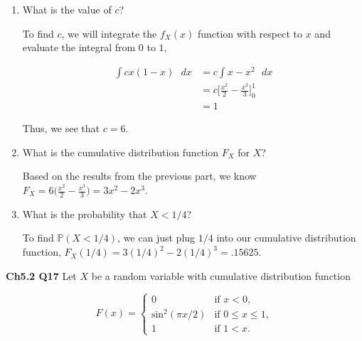 \documentclass[12pt]{article}
\begin{document}
\begin{enumerate}[label=(\alph*)]
\item What is the value of $c$?

\noindent
To find $c$, we will integrate the $f_X(x) $ function with respect to $x$ and evaluate the integral from $0$ to $1$,

\begin{align*}
\int c x(1-x) \text{ } dx &= c \int  x-x^2 \text{ } dx \\
&= c \Bigg [ \frac{x^2}{2}-\frac{x^3}{3} \Bigg ]_{0}^{1} \\
&=1
\end{align*} 

\noindent
Thus, we see that $c = 6$.

\item What is the cumulative distribution function $F_X$ for $X$?

\noindent
Based on the results from the previous part, we know $F_X = 6 \big ( \frac{x^2}{2}-\frac{x^3}{3} \big ) = 3x^2-2x^3$.

\item What is the probability that $X < 1/4$?

\noindent
To find $\mathbb{P}(X < 1/4)$, we can just plug $1/4$ into our cumulative distribution function, $F_X(1/4) = 3(1/4)^2-2(1/4)^3 = .15625$.

\end{enumerate}


\vspace*{1cm}
\noindent
\textbf{Ch5.2 Q17} Let $X$ be a random variable with cumulative distribution function

\[ F(x) =  \begin{cases} 
	  0 & \text{if } x < 0, \\
      \text{sin}^2(\pi x / 2) & \text{if } 0 \leq x \leq 1, \\
      1 & \text{if } 1 < x.
      \end{cases} \]
      
\end{document}
